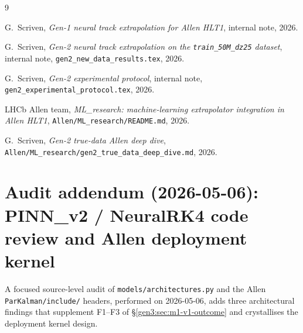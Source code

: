 \documentclass[a4paper,11pt]{article}
\begin{document}
\begin{thebibliography}{9}

G.~Scriven, \emph{Gen-1 neural track extrapolation for Allen HLT1},
internal note, 2026.

G.~Scriven, \emph{Gen-2 neural track extrapolation on the
\texttt{train\_50M\_dz25} dataset}, internal note,
\texttt{gen2\_new\_data\_results.tex}, 2026.

G.~Scriven, \emph{Gen-2 experimental protocol}, internal note,
\texttt{gen2\_experimental\_protocol.tex}, 2026.

LHCb Allen team, \emph{ML\_research: machine-learning extrapolator
integration in Allen HLT1}, \texttt{Allen/ML\_research/README.md},
2026.

G.~Scriven, \emph{Gen-2 true-data Allen deep dive},
\texttt{Allen/ML\_research/gen2\_true\_data\_deep\_dive.md}, 2026.

\end{thebibliography}

\section{Audit addendum (2026-05-06): PINN\_v2 / NeuralRK4 code review and
         Allen deployment kernel}\label{gen3:sec:audit-addendum}

A focused source-level audit of
\texttt{models/architectures.py} and the Allen
\texttt{ParKalman/include/} headers, performed on 2026-05-06,
adds three architectural findings that supplement F1--F3 of
\S\ref{gen3:sec:m1-v1-outcome} and crystallises the deployment
kernel design.
\end{document}
